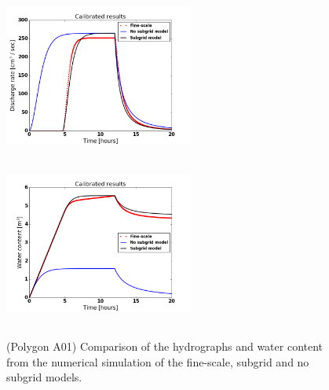 \documentclass[review,11pt]{elsarticle}
\begin{document}
\begin{figure}[!h]
\centering
\includegraphics[width=6.2cm, height=5.5cm]{./figures/POLYGON_A01/POLYGON_A01dischargeCalibDDManning.png}
\includegraphics[width=6.2cm, height=5.5cm]{./figures/POLYGON_A01/POLYGON_A01watercontentCalibDDManning.png}
\caption{(Polygon A01) Comparison of the hydrographs and water content from the numerical simulation of the fine-scale, subgrid and no subgrid models. }
\label{polygon-A01}
\end{figure}
\end{document}
